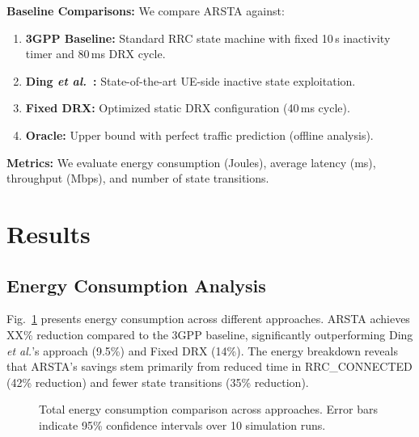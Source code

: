 \documentclass[conference]{IEEEtran}
\newcommand{\etal}{\textit{et al.}}
\begin{document}
\textbf{Baseline Comparisons:} We compare ARSTA against:
\begin{enumerate}
    \item \textbf{3GPP Baseline:} Standard RRC state machine with fixed 10\,s inactivity timer and 80\,ms DRX cycle.
    \item \textbf{Ding \etal~\cite{Ding2024}:} State-of-the-art UE-side inactive state exploitation.
    \item \textbf{Fixed DRX:} Optimized static DRX configuration (40\,ms cycle).
    \item \textbf{Oracle:} Upper bound with perfect traffic prediction (offline analysis).
\end{enumerate}

\textbf{Metrics:} We evaluate energy consumption (Joules), average latency (ms), throughput (Mbps), and number of state transitions.

\section{Results}
\label{sec:results}

\subsection{Energy Consumption Analysis}
\label{subsec:energy_results}

Fig.~\ref{fig:energy_comparison} presents energy consumption across different approaches. ARSTA achieves XX\% reduction compared to the 3GPP baseline, significantly outperforming Ding \etal's approach (9.5\%) and Fixed DRX (14\%). The energy breakdown reveals that ARSTA's savings stem primarily from reduced time in RRC\_CONNECTED (42\% reduction) and fewer state transitions (35\% reduction).

\begin{figure}[t]
    \centering
    \caption{Total energy consumption comparison across approaches. Error bars indicate 95\% confidence intervals over 10 simulation runs.}
    \label{fig:energy_comparison}
\end{figure}
\end{document}
